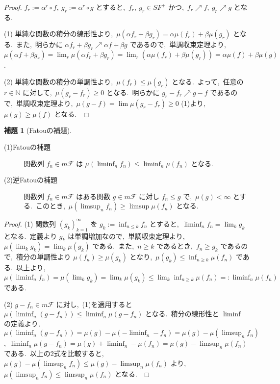 \documentclass[a4j,11pt]{jarticle}
\theoremstyle{definition}
\newtheorem{lemma}[theorem]{補題}
\begin{document}
\begin{proof}
  $f_r := \alpha^r \circ f,\ g_r := \alpha^r \circ g$
  とすると,\ 
  $f_r,\ g_r \in SF^+$
  かつ,\ 
  $f_r \nearrow f,\ g_r \nearrow g$
  となる.\ 
  
  (1)
  単純な関数の積分の線形性より,\ 
  $\mu(\alpha f_r + \beta g_r) = \alpha \mu(f_r) + \beta \mu(g_r)$
  となる.\ 
  また,\ 明らかに
  $\alpha f_r + \beta g_r \nearrow \alpha f + \beta g$
  であるので,\ 単調収束定理より,\ 
  $\mu(\alpha f + \beta g_r) = \lim_r \mu(\alpha f_r + \beta g_r) = \lim_r \left(  \alpha \mu(f_r) + \beta \mu(g_r) \right) = \alpha \mu(f) + \beta \mu(g)$.

  (2)
  単純な関数の積分の単調性より,\ 
  $\mu(f_r) \leq \mu(g_r)$
  となる.\ 
  よって,\ 任意の
  $r \in \mathbb{N}$
  に対して,\ 
  $\mu(g_r - f_r) \geq 0$
  となる.\ 
  明らかに
  $g_r-f_r \nearrow g-f$
  であるので,\ 単調収束定理より,\ 
  $\mu(g-f) = \lim \mu(g_r - f_r) \geq 0$
  (1)より,\ 
  $\mu(g) \geq \mu(f)$
  となる.\ 
\end{proof}


\begin{lemma}[Fatouの補題]\label{lemma:Fatou}
  \mbox{}
  \begin{description}
    \item[(1)Fatouの補題]
      関数列
      $f_n \in m\mathcal{F}$
      は
      $\mu\left( \liminf_n f_n\right) \leq \liminf_n \mu(f_n)$
      となる.\ 
    \item[(2)逆Fatouの補題]
      関数列
      $f_n \in m\mathcal{F}$
      はある関数
      $g \in m\mathcal{F}$
      に対し
      $f_n \leq g$
      で,\ 
      $\mu(g) < \infty$
      とする.\ 
      このとき,\ 
      $\mu\left( \limsup_n f_n\right) \geq \limsup \mu(f_n)$
      となる.\ 
  \end{description}
\end{lemma}

\begin{proof}
  (1)
  関数列
  $(g_k)_{k=1}^{\infty}$
  を
  $g_k:= \inf_{n\leq k} f_n$
  とすると,\ 
  $\liminf_n f_n = \lim_k g_k$
  となる.\ 
  定義より
  $g_k$
  は単調増加なので,\ 単調収束定理より,\ 
  $\mu\left( \lim_k g_k\right) = \lim_k \mu(g_k)$
  である.\ 
  また,\ 
  $n \geq k$
  であるとき,\ 
  $f_n \geq g_k$
  であるので,\ 積分の単調性より
  $\mu(f_n) \geq \mu(g_k)$
  となり,\ 
  $\mu(g_k) \leq \inf_{n\geq k} \mu(f_n)$
  である.\ 
  以上より,\ 
  $\mu\left( \liminf_n f_n\right) = \mu\left( \lim_k g_k\right) = \lim_k \mu(g_k) \leq \lim_k \inf_{n\geq k} \mu(f_n) =: \liminf_n \mu(f_n)$
  である.\ 

  (2)
  $g-f_n \in m\mathcal{F}$
  に対し,\ (1)を適用すると
  $\mu\left( \liminf_n (g-f_n)\right) \leq \liminf_n \mu(g-f_n)$
  となる.\ 
  積分の線形性と
  $\liminf$
  の定義より,\ 
  $\mu\left( \liminf_n (g-f_n)\right) = \mu(g) - \mu\left( -\liminf_n -f_n\right) = \mu(g) - \mu\left( \limsup_n f_n\right)$,\ 
  $\liminf_n \mu(g-f_n) = \mu(g) + \liminf_n - \mu(f_n) = \mu(g) - \limsup_n \mu(f_n)$
  である.\ 
  以上の2式を比較すると,\ 
  $\mu(g) - \mu\left( \limsup_n f_n\right) \leq \mu(g) - \limsup_n \mu(f_n)$
  より,\ 
  $\mu\left( \limsup_n f_n\right) \leq \limsup_n \mu(f_n)$
  となる.\ 
\end{proof}
\end{document}
